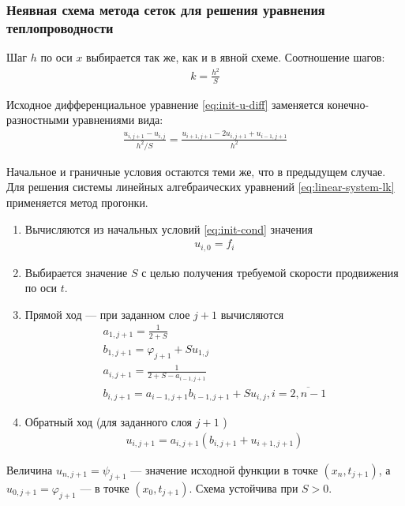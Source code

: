 \subsubsection{Неявная схема метода сеток для решения уравнения теплопроводности}
Шаг \(h\) по оси \(x\) выбирается так же, как и в явной схеме. Соотношение шагов:
\begin{align}
	k = \frac{h^2}{S}
\end{align}

Исходное дифференциальное уравнение \cref{eq:init-u-diff} заменяется конечно-разностными уравнениями вида:
\begin{align}\label{eq:linear-system-lk}
	\frac{u_{i,j+1} - u_{i,j}}{h^2/S} = \frac{u_{i+1,j+1} - 2u_{i,j+1} + u_{i-1,j+1}}{h^2}
\end{align}

Начальное и граничные условия остаются теми же, что в предыдущем случае. Для решения системы линейных алгебраических уравнений \cref{eq:linear-system-lk} применяется метод прогонки.

\begin{enumerate}
	\item Вычисляются из начальных условий \cref{eq:init-cond} значения
	      \begin{align}
		      u_{i,0} = f_i
	      \end{align}
	\item Выбирается значение \(S\) с целью получения требуемой скорости продвижения по оси \(t\).
	\item Прямой ход --- при заданном слое \(j+1\) вычисляются
	      \begin{align}
		      a_{1,j+1} = \frac{1}{2+S}              \\
		      b_{1,j+1} = \varphi_{j+1} + S u_{1, j} \\
		      a_{i,j+1} = \frac{1}{2+S-a_{i-1,j+1}}  \\
		      b_{i,j+1} = a_{i-1,j+1}b_{i-1,j+1}+S u_{i,j}, i = \overline{2, n-1}
	      \end{align}
	\item Обратный ход (для заданного слоя \(j+1\) )
	      \begin{align}
		      u_{i,j+1} = a_{i,j+1}(b_{i,j+1}+u_{i+1,j+1})
	      \end{align}
\end{enumerate}

Величина \(u_{n,j+1} = \psi_{j+1}\) --- значение исходной функции в точке \((x_n, t_{j+1})\), а \(u_{0,j+1} = \varphi_{j+1}\) --- в точке \((x_0, t_{j+1})\). Схема устойчива при \(S > 0\).

